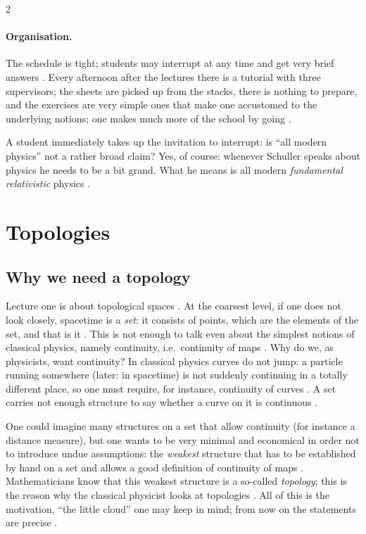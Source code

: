 \begin{paracol}{2}
\paragraph{Organisation.} The schedule is tight; students may interrupt at any time and get very brief answers
. Every afternoon after the lectures there is a tutorial with three supervisors; the sheets are
picked up from the stacks, there is nothing to prepare, and the exercises are very simple ones that make one accustomed to the
underlying notions; one makes much more of the school by going .

A student immediately takes up the invitation to interrupt: is ``all modern physics'' not a rather broad claim? Yes, of course:
whenever Schuller speaks about physics he needs to be a bit grand. What he means is all modern \emph{fundamental relativistic}
physics .

\section{Topologies}\label{sec:c01-topology}

\subsection{Why we need a topology}

Lecture one is about topological spaces . At the coarsest level, if one does not look closely, spacetime is a
\emph{set}: it consists of points, which are the elements of the set, and that is it . This is not enough to talk
even about the simplest notions of classical physics, namely continuity, i.e.\ continuity of maps . Why do we, as
physicists, want continuity? In classical physics curves do not jump: a particle running somewhere (later: in spacetime) is not
suddenly continuing in a totally different place, so one must require, for instance, continuity of curves
. A set carries not enough structure to say whether a curve on it is continuous .

One could imagine many structures on a set that allow continuity (for instance a distance measure), but one wants to be very
minimal and economical in order not to introduce undue assumptions: the \emph{weakest} structure that has to be established
by hand on a set and allows a good definition of continuity of maps . Mathematicians
know that this weakest structure is a so-called \emph{topology}; this is the reason why the classical physicist looks at
topologies . All of this is the motivation, ``the little cloud'' one may keep in mind; from now on
the statements are precise .


\end{paracol}
